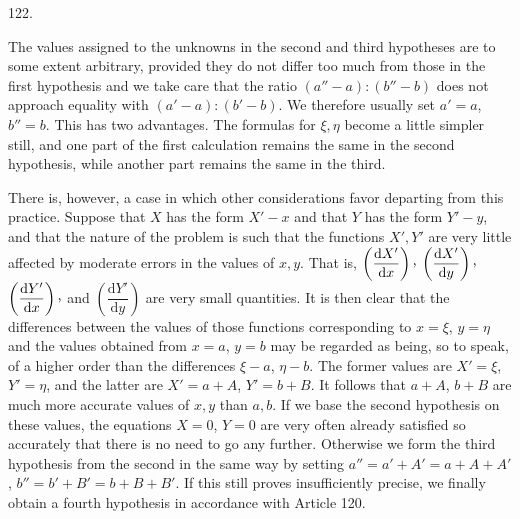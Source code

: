 \par{}\medskip
\begin{center}\hypertarget{native-169-article122}{}122.\end{center}
The values assigned to the unknowns in the second and third hypotheses are to some extent arbitrary, provided they do not differ too much from those in the first hypothesis and we take care that the ratio $(a''-a):(b''-b)$ does not approach equality with $(a'-a):(b'-b)$. We therefore usually set $a'=a$, $b''=b$. This has two advantages. The formulas for $\xi,\eta$ become a little simpler still, and one part of the first calculation remains the same in the second hypothesis, while another part remains the same in the third.

There is, however, a case in which other considerations favor departing from this practice. Suppose that $X$ has the form $X'-x$ and that $Y$ has the form $Y'-y$, and that the nature of the problem is such that the functions $X',Y'$ are very little affected by moderate errors in the values of $x,y$. That is, $\left(\dfrac{\mathrm{d}X'}{\mathrm{d}x}\right)\mathpunct{\raisebox{.45ex}{,}}$ $\left(\dfrac{\mathrm{d}X'}{\mathrm{d}y}\right)\mathpunct{\raisebox{.45ex}{,}}$ $\left(\dfrac{\mathrm{d}Y'}{\mathrm{d}x}\right)\mathpunct{\raisebox{.45ex}{,}}$ and $\left(\dfrac{\mathrm{d}Y'}{\mathrm{d}y}\right)$ are very small quantities. It is then clear that the differences between the values of those functions corresponding to $x=\xi$, $y=\eta$ and the values obtained from $x=a$, $y=b$ may be regarded as being, so to speak, of a higher order than the differences $\xi-a$, $\eta-b$. The former values are $X'=\xi$, $Y'=\eta$, and the latter are $X'=a+A$, $Y'=b+B$. It follows that $a+A$, $b+B$ are much more accurate values of $x,y$ than $a,b$. If we base the second hypothesis on these values, the equations $X=0$, $Y=0$ are very often already satisfied so accurately that there is no need to go any further. Otherwise we form the third hypothesis from the second in the same way by setting $a''=a'+A'=a+A+A'$, $b''=b'+B'=b+B+B'$. If this still proves insufficiently precise, we finally obtain a fourth hypothesis in accordance with Article 120.

